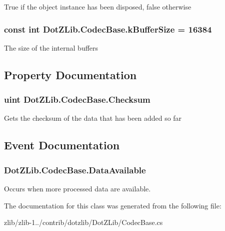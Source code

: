 True if the object instance has been disposed, false otherwise 

\hypertarget{class_dot_z_lib_1_1_codec_base_a6cf60968f7eaa921e5a8108e0ebcb880}{
\subsubsection[{k\+Buffer\+Size}]{\setlength{\rightskip}{0pt plus 5cm}const int Dot\+Z\+Lib.\+Codec\+Base.\+k\+Buffer\+Size = 16384\hspace{0.3cm}{\ttfamily [protected]}}}\label{class_dot_z_lib_1_1_codec_base_a6cf60968f7eaa921e5a8108e0ebcb880}


The size of the internal buffers 



\subsection{Property Documentation}
\hypertarget{class_dot_z_lib_1_1_codec_base_aac848293ff53082bb60cb561daa6fd6b}{
\subsubsection[{Checksum}]{\setlength{\rightskip}{0pt plus 5cm}uint Dot\+Z\+Lib.\+Codec\+Base.\+Checksum\hspace{0.3cm}{\ttfamily [get]}}}\label{class_dot_z_lib_1_1_codec_base_aac848293ff53082bb60cb561daa6fd6b}


Gets the checksum of the data that has been added so far 



\subsection{Event Documentation}
\hypertarget{class_dot_z_lib_1_1_codec_base_a985cf58f6ed5cfeeb9fd8c34a7c052d4}{
\subsubsection[{Data\+Available}]{ Dot\+Z\+Lib.\+Codec\+Base.\+Data\+Available}}\label{class_dot_z_lib_1_1_codec_base_a985cf58f6ed5cfeeb9fd8c34a7c052d4}


Occurs when more processed data are available. 



The documentation for this class was generated from the following file\+:\begin{DoxyCompactItemize}
\item 
zlib/zlib-\/1../contrib/dotzlib/\+Dot\+Z\+Lib/Codec\+Base.\+cs\end{DoxyCompactItemize}
